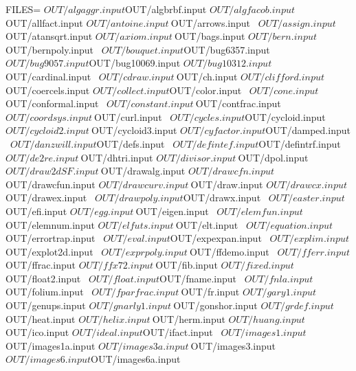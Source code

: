 \documentclass{article}
\begin{document}
FILES= ${OUT}/algaggr.input  ${OUT}/algbrbf.input    ${OUT}/algfacob.input \
       ${OUT}/allfact.input    ${OUT}/antoine.input  \
       ${OUT}/arrows.input \
       ${OUT}/assign.input   ${OUT}/atansqrt.input   ${OUT}/axiom.input \
       ${OUT}/bags.input     ${OUT}/bern.input \
       ${OUT}/bernpoly.input \
       ${OUT}/bouquet.input  ${OUT}/bug6357.input \
       ${OUT}/bug9057.input  ${OUT}/bug10069.input   ${OUT}/bug10312.input \
       ${OUT}/cardinal.input \
       ${OUT}/cdraw.input      \
       ${OUT}/ch.input       ${OUT}/clifford.input   \
       ${OUT}/coercels.input ${OUT}/collect.input    ${OUT}/color.input \
       ${OUT}/cone.input       ${OUT}/conformal.input \
       ${OUT}/constant.input \
       ${OUT}/contfrac.input ${OUT}/coordsys.input \
       ${OUT}/curl.input     \
       ${OUT}/cycles.input   ${OUT}/cycloid.input  \
       ${OUT}/cycloid2.input \
       ${OUT}/cycloid3.input ${OUT}/cyfactor.input   ${OUT}/damped.input \
       ${OUT}/danzwill.input ${OUT}/defs.input \
       ${OUT}/defintef.input ${OUT}/defintrf.input   \
       ${OUT}/de2re.input \
       ${OUT}/dhtri.input      ${OUT}/divisor.input \
       ${OUT}/dpol.input       ${OUT}/draw2dSF.input \
       ${OUT}/drawalg.input  ${OUT}/drawcfn.input \
       ${OUT}/drawcfun.input ${OUT}/drawcurv.input \
       ${OUT}/draw.input     ${OUT}/drawcx.input     ${OUT}/drawex.input \
       ${OUT}/drawpoly.input ${OUT}/drawx.input    \
       ${OUT}/easter.input   ${OUT}/efi.input        ${OUT}/egg.input      \
       ${OUT}/eigen.input \
       ${OUT}/elemfun.input  ${OUT}/elemnum.input    ${OUT}/elfuts.input \
       ${OUT}/elt.input \
       ${OUT}/equation.input \
       ${OUT}/errortrap.input \
       ${OUT}/eval.input     ${OUT}/expexpan.input \
       ${OUT}/explim.input   ${OUT}/explot2d.input   \
       ${OUT}/exprpoly.input \
       ${OUT}/ffdemo.input \
       ${OUT}/fferr.input    ${OUT}/ffrac.input      ${OUT}/ffx72.input \
       ${OUT}/fib.input      ${OUT}/fixed.input \
       ${OUT}/float2.input \
       ${OUT}/float.input    ${OUT}/fname.input \
       ${OUT}/fnla.input     ${OUT}/folium.input   \
       ${OUT}/fparfrac.input \
       ${OUT}/fr.input       ${OUT}/gary1.input \
       ${OUT}/genups.input     ${OUT}/gnarly1.input \
       ${OUT}/gonshor.input  ${OUT}/grdef.input    \
       ${OUT}/heat.input       ${OUT}/helix.input \
       ${OUT}/herm.input     ${OUT}/huang.input \
       ${OUT}/ico.input      ${OUT}/ideal.input      ${OUT}/ifact.input \
       ${OUT}/images1.input  ${OUT}/images1a.input   ${OUT}/images3a.input \
       ${OUT}/images3.input  ${OUT}/images6.input    ${OUT}/images6a.input \
\end{document}
